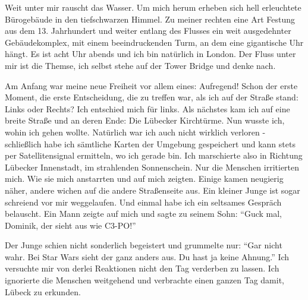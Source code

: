 Weit unter mir rauscht das Wasser. Um mich herum erheben sich hell erleuchtete Bürogebäude in den tiefschwarzen Himmel. Zu meiner rechten eine Art Festung aus dem 13. Jahrhundert und weiter entlang des Flusses ein weit ausgedehnter Gebäudekomplex, mit einem beeindruckenden Turm, an dem eine gigantische Uhr hängt. Es ist acht Uhr abends und ich bin natürlich in London. Der Fluss unter mir ist die Themse, ich selbst stehe auf der Tower Bridge und denke nach.

Am Anfang war meine neue Freiheit vor allem eines: Aufregend! Schon der erste Moment, die erste Entscheidung, die zu treffen war, als ich auf der Straße stand: Links oder Rechts? Ich entschied mich für links. Als nächstes kam ich auf eine breite Straße und an deren Ende: Die Lübecker Kirchtürme. Nun wusste ich, wohin ich gehen wollte. Natürlich war ich auch nicht wirklich verloren - schließlich habe ich sämtliche Karten der Umgebung gespeichert und kann stets per Satellitensignal ermitteln, wo ich gerade bin. Ich marschierte also in Richtung Lübecker Innenstadt, im strahlenden Sonnenschein. Nur die Menschen irritierten mich. Wie sie mich anstarrten und auf mich zeigten. Einige kamen neugierig näher, andere wichen auf die andere Straßenseite aus. Ein kleiner Junge ist sogar schreiend vor mir weggelaufen. Und einmal habe ich ein seltsames Gespräch belauscht. Ein Mann zeigte auf mich und sagte zu seinem Sohn: "`Guck mal, Dominik, der sieht aus wie C3-PO!"'

Der Junge schien nicht sonderlich begeistert und grummelte nur: "`Gar nicht wahr. Bei Star Wars sieht der ganz anders aus. Du hast ja keine Ahnung."' Ich versuchte mir von derlei Reaktionen nicht den Tag verderben zu lassen. Ich ignorierte die Menschen weitgehend und verbrachte einen ganzen Tag damit, Lübeck zu erkunden.

